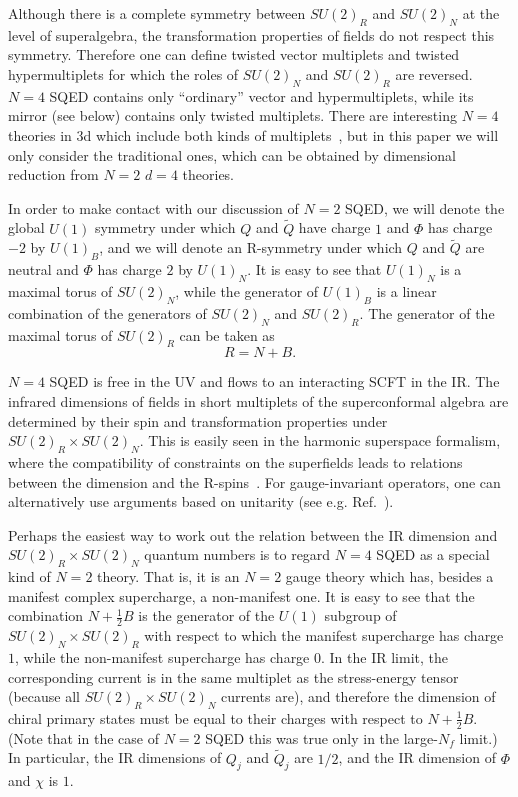 \documentclass[a4paper,12pt, amsfonts, amssymb]{article}
\newcommand{\tQ}{{\tilde Q}}
\begin{document}
Although there is a complete symmetry between $SU(2)_R$ and $SU(2)_N$ at
the level of superalgebra, the transformation properties of
fields do not respect this symmetry. Therefore one can define twisted
vector multiplets and twisted hypermultiplets for which the roles of
$SU(2)_N$ and $SU(2)_R$ are reversed. $N=4$ SQED contains only
``ordinary'' vector and hypermultiplets, while its mirror (see below)
contains only twisted multiplets. There are interesting $N=4$ theories in 3d
which include both kinds of multiplets~\cite{BG,KS}, but in this paper we
will only consider the traditional ones, which can be obtained by dimensional
reduction from $N=2$ $d=4$ theories.

In order to make contact with our discussion of
$N=2$ SQED, we will denote the global $U(1)$ symmetry under which
$Q$ and $\tQ$ have charge $1$ and $\Phi$ has charge $-2$ by $U(1)_B$,
and we will denote an R-symmetry under which $Q$ and $\tQ$ are neutral
and $\Phi$ has charge $2$ by $U(1)_N$. It is easy to see that $U(1)_N$
is a maximal torus of $SU(2)_N$, while the generator of $U(1)_B$
is a linear combination of the generators of $SU(2)_N$ and $SU(2)_R$.
The generator of the maximal torus of $SU(2)_R$ can be taken as
$$
R=N+B.
$$

$N=4$ SQED is free in the UV and flows to an interacting SCFT in the IR.
The infrared dimensions of fields in short multiplets of the superconformal
algebra are determined by their spin and transformation properties under
$SU(2)_R\times SU(2)_N$.  This is easily seen in the harmonic superspace
formalism, where the compatibility of constraints on the superfields leads to
relations between the dimension and the R-spins~\cite{HS}. For gauge-invariant
operators, one can alternatively use arguments based on unitarity (see
e.g. Ref.~\cite{Minwalla}). 

Perhaps the easiest way to work out the relation
between the IR dimension and $SU(2)_R\times SU(2)_N$ quantum numbers
is to regard $N=4$ SQED as a special kind of $N=2$ theory. That is, it
is an $N=2$ gauge theory which has, besides a manifest complex supercharge,
a non-manifest one. It is easy to
see that the combination $N+\frac{1}{2} B$ is the generator of
the $U(1)$ subgroup of $SU(2)_N\times SU(2)_R$ with respect to which 
the manifest supercharge has charge $1$, 
while the non-manifest supercharge has charge $0$. In the IR limit, the corresponding current is in the
same multiplet as the stress-energy tensor (because all $SU(2)_R\times SU(2)_N$
currents are), and therefore the dimension of chiral primary states
must be equal to their charges with respect to $N+\frac{1}{2}B$. (Note
that in the case of $N=2$ SQED this was true only in the large-$N_f$
limit.) In particular, the IR dimensions of $Q_j$ and $\tQ_j$ are
$1/2$, and the IR dimension of $\Phi$ and $\chi$ is $1$. 
\end{document}
